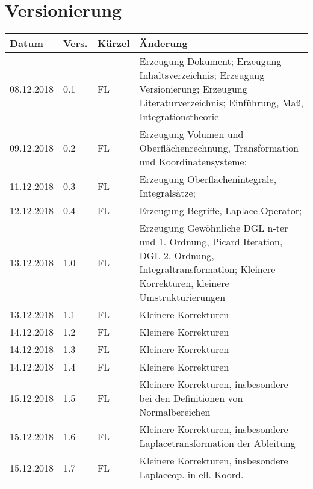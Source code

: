 \newpage
\tableofcontents

\section*{Versionierung}
\begin{tabular}{|p{2cm}|p{1cm}|p{1.5cm}|p{8.5cm}|}\hline
Datum & Vers. & Kürzel & Änderung \\ \hline
08.12.2018 & 0.1 & FL & Erzeugung Dokument; Erzeugung Inhaltsverzeichnis; Erzeugung Versionierung; Erzeugung Literaturverzeichnis; Einführung, Maß, Integrationstheorie \\ \hline
09.12.2018 & 0.2 & FL & Erzeugung Volumen und Oberflächenrechnung, Transformation und Koordinatensysteme; \\ \hline
11.12.2018 & 0.3 & FL & Erzeugung Oberflächenintegrale, Integralsätze; \\ \hline
12.12.2018 & 0.4 & FL &Erzeugung Begriffe, Laplace Operator; \\ \hline
13.12.2018 & 1.0 & FL & Erzeugung Gewöhnliche DGL n-ter und 1. Ordnung, Picard Iteration, DGL 2. Ordnung, Integraltransformation; Kleinere Korrekturen, kleinere Umstrukturierungen \\ \hline
13.12.2018 & 1.1 & FL & Kleinere Korrekturen\\ \hline
14.12.2018 & 1.2 & FL & Kleinere Korrekturen \\ \hline
14.12.2018 & 1.3 & FL & Kleinere Korrekturen \\ \hline
14.12.2018 & 1.4 & FL & Kleinere Korrekturen \\ \hline
15.12.2018 & 1.5 & FL & Kleinere Korrekturen, insbesondere bei den Definitionen von Normalbereichen \\ \hline
15.12.2018 & 1.6 & FL & Kleinere Korrekturen, insbesondere Laplacetransformation der Ableitung\\ \hline
15.12.2018 & 1.7 & FL & Kleinere Korrekturen, insbesondere Laplaceop. in ell. Koord.\\ \hline
\end{tabular}
\listoffigures